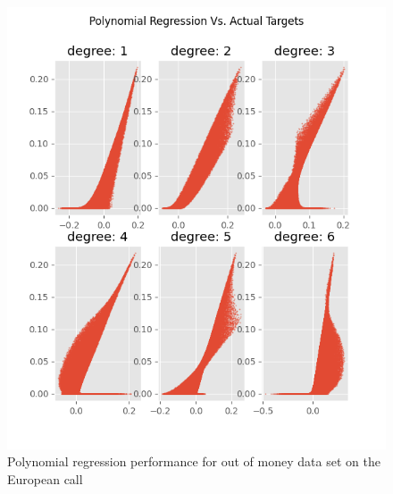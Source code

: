 \begin{figure}[H]
\centering
\includegraphics{Figures/polynomialOutMoneyEuroC.png}
\decoRule
\caption[Polynomial Regression Performance for Out-of-money Data Set European Call]{Polynomial regression performance for out of money data set on the European call}
\label{fig:MLPsEuroCOutOfMoney}
\end{figure}


